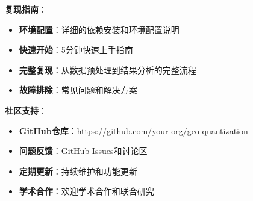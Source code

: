 \textbf{复现指南}：
\begin{itemize}
\item \textbf{环境配置}：详细的依赖安装和环境配置说明
\item \textbf{快速开始}：5分钟快速上手指南
\item \textbf{完整复现}：从数据预处理到结果分析的完整流程
\item \textbf{故障排除}：常见问题和解决方案
\end{itemize}

\textbf{社区支持}：
\begin{itemize}
\item \textbf{GitHub仓库}：https://github.com/your-org/geo-quantization
\item \textbf{问题反馈}：GitHub Issues和讨论区
\item \textbf{定期更新}：持续维护和功能更新
\item \textbf{学术合作}：欢迎学术合作和联合研究
\end{itemize}






